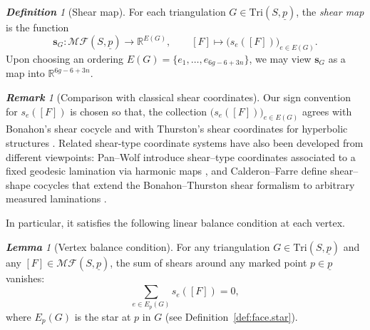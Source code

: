 \documentclass[11pt, letterpaper]{amsart}
\theoremstyle{definition}
\theoremstyle{remark}
\newtheorem{lemma}[theorem]{\rm\bf Lemma}
\newtheorem{definition}[theorem]{\rm\bf Definition}
\newtheorem{remark}[theorem]{\rm\bf Remark}
\newcommand{\up}{\underline{p}}
\newcommand{\Sp}{(S,\up)}
\newcommand{\TSp}{\text{Tri}\Sp}
\newcommand{\cMFp}{\mathcal{MF} (S,\up)}
\newcommand{\bR}{\mathbb{R}}
\newcommand{\DEF}{} \newcommand{\WARN}{\textcolor{red}} \newcommand{\ALT}{\textcolor{brown}} \newcommand{\TODO}{\textcolor{teal}} %
\numberwithin{equation}{section}
\begin{document}
\begin{definition}[Shear map]
    \label{def:MF.shear.map.global}
    For each triangulation \(G\in\TSp\), the \DEF{\em shear map} is the function
    \[
    \mathbf{s}_G : \cMFp \longrightarrow \bR^{E(G)}, \qquad
    [F] \longmapsto \bigl(s_e([F])\bigr)_{e\in E(G)}.
    \]
    Upon choosing an ordering \(E(G)=\{e_1,\dots,e_{6g-6+3n}\}\), we may view \(\mathbf{s}_G\) as a map into \(\bR^{6g-6+3n}\).
\end{definition}



\begin{remark}[Comparison with classical shear coordinates]
\label{rem:MF.shear.classical}
Our sign convention for \(s_e([F])\) is chosen so that, the collection \(\bigl(s_e([F])\bigr)_{e\in E(G)}\) agrees with Bonahon's shear cocycle \cite{Bon96} and with Thurston's shear coordinates for hyperbolic structures \cite{Thu98}.
Related shear-type coordinate systems have also been developed from different viewpoints: Pan--Wolf introduce shear--type coordinates associated to a fixed geodesic lamination via harmonic maps \cite{PW22}, and Calderon--Farre define shear--shape cocycles that extend the Bonahon--Thurston shear formalism to arbitrary measured laminations \cite{CF24}.
\end{remark}



In particular, it satisfies the following linear balance condition at each vertex.

\begin{lemma}[Vertex balance condition]
    \label{lem:balanc.cond.}
    For any triangulation \(G \in \TSp\) and any \([F] \in \cMFp\), the sum of shears around any marked point \(p \in \up\) vanishes:
    \begin{equation}\label{eq:shear-cond}
    \sum_{e \in E_p(G)} s_{e}([F]) = 0,
    \end{equation}
    where \(E_p(G)\) is the star at \(p\) in \(G\) (see Definition~\ref{def:face.star}).
\end{lemma}
\end{document}
